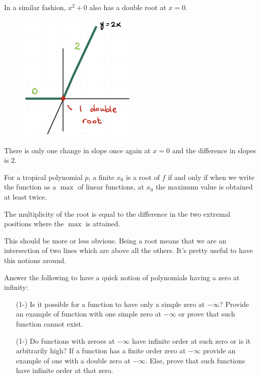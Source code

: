 \documentclass[12pt]{memoir}
\begin{document}
\begin{Ex}
    In a similar fashion, $x^2+0$ also has a double root at $x=0$.
    \begin{figure}[h!]
        \centering
        \includegraphics[width=0.5\textwidth]{figs/fig3-6DoubleRootTropicalPolynomial2.png}
        \label{fig:3.6-DoubleRoot6}
    \end{figure}
    There is only one change in slope once again at $x=0$ and the difference in slopes is $2$.
\end{Ex}

\begin{Lem}
For a tropical polynomial $p$, a finite $x_0$ is a root of $f$ if and only if when we write the function as a $\max$ of linear functions, at $x_0$ the maximum value is obtained at least twice.\par 
The multiplicity of the root is equal to the difference in the two extremal positions where the $\max$ is attained.
\end{Lem}

This should be more or less obvious. Being a root means that we are an intersection of two lines which are above all the others. It's pretty useful to have this notions around.

\begin{Ej}
    Answer the following to have a quick notion of polynomials having a zero at infinity:
    \begin{itemize}
        \item[(1-)] Is it possible for a function to have only a simple zero at $-\infty$? Provide an example of function with one simple zero at $-\infty$ or prove that such function cannot exist. 
        \item[(1-)] Do functions with zeroes at $-\infty$ have infinite order at such zero or is it arbitrarily high? If a function has a finite order zero at $-\infty$ provide an example of one with a double zero at $-\infty$. Else, prove that such functions have infinite order at that zero.
    \end{itemize}
\end{Ej}
\end{document}
